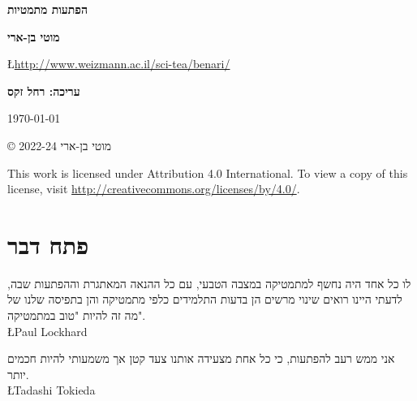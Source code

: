 
\pagestyle{empty}

\begin{center}
\textbf{\Huge הפתעות מתמטיות}
 
\bigskip
\bigskip
\bigskip
\bigskip

\textbf{\Large מוטי בן-ארי}

\L{\url{http://www.weizmann.ac.il/sci-tea/benari/}}
\bigskip
\bigskip

\textbf{\Large עריכה: רחל זקס}

\bigskip
\bigskip

\today{}
\end{center}


\vfill

\begin{center}
\copyright{} מוטי בן-ארי
2022-24
 \end{center}

\begin{english}
\begin{small}
This work is licensed under Attribution 4.0 International. To view a copy of this license, visit \url{http://creativecommons.org/licenses/by/4.0/}.

\end{small}
\end{english}



\thispagestyle{empty}
\pagestyle{plain}

\chapter*{פתח דבר}
\thispagestyle{empty}

\begin{flushleft}
\parbox{7cm}{
\begin{small}
\begin{flushleft}
לו כל אחד היה נחשף למתמטיקה במצבה הטבעי, עם כל ההנאה המאתגרת וההפתעות שבה, לדעתי היינו רואים שינוי מרשים הן בדעות התלמידים כלפי מתמטיקה והן בתפיסה שלנו של מה זה להיות "טוב במתמטיקה".\\
\L{Paul Lockhard}

\bigskip

אני ממש רעב להפתעות, כי כל אחת מצעידה אותנו צעד קטן אך משמעותי להיות חכמים יותר.\\
\L{Tadashi Tokieda}
\end{flushleft}
\end{small}
}
\end{flushleft}

